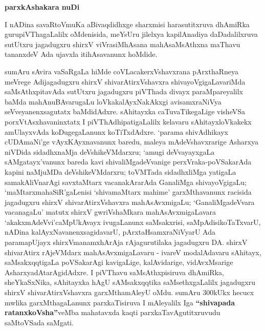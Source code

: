 \begin{center}
{\Huge\bfseries parxkAshakara nuDi}
\end{center}

I nADina savaRtoVmuKa aBivaqdidhxge sharxmisi harasutitxruva dhAmiRka gurupiVThagaLalilx oMdenisida, meYsUru jilelxya kapilA\-nadiya daDadalilxruva sutUtxru jagadugxru shirxV viVrasiMhAsana mahAsaMsAthxna maThavu tananxdeV Ada ujavxla itihAsavanunx hoMdide.

\medskip

sumAru sAvira vaSaRgaLa hiMde coVLacakerxVshavxrana pArxthaRneya meVrege Adijagadugxru shirxV shivarAtirxVshavxra shivayoVgigaLavariMda saMsAthxpitavAda sutUtxru jagadugxru piVThada divayx paraMpareyalilx baMda mahAnuBAvarugaLu loVkakalAyxNakAkxgi avisamxraNiVya seVveyanenxsagutatx baMdidAdxre. sAhitayxka caTuvaTikegaLige visheVSa porxVtAsxhavaninxtatx I piVThAdhipatigaLalilx kelavaru sAhitayxloVkakekx amUlayxvAda koDugegaLanunx koTiTxdAdxre. `parama shivAdhikayx cUDAmaNi'ge vAyxKAyxnavanunx baredu, maleya mAdeVshavxrarige Asharxya niVDida sidadhxnaMja deVshikeVMdarxru; `amugi deVvayayxgaLa sAMgatayx'vanunx bareda kavi shivaliMga\-deVvanige perxVraka-poVSakarAda kapini naMjuMDa deVshikeVMdarxru; toVMTada sidadhxliMga yatigaLa samakAliVnarAgi savxtaMtarx vacana\-kAra\-rAda GanaliMga shivayoVgigaLu; `maMtarxmahaSiR'gaLenisi `shivamaMtarx mahime' garxMthavanunx racisida jagadugxru shirxV shivarAtirxVshavxra mahAsAvxmigaLu; `GanaliMgadeVvara vacanagaLu' matutx shirxV gwriVshaMkara mahAsAvxmigaLavara `akakxmAdeVvi'\break caMpUkAvayx ivugaLanunx saMsakxrisi, saMpAdisikoTaTxvarU, nADina kalAyxNavanenxsagidavarU, pArxtaHsamxraNiVyarU Ada paramapUjayx shirxVmanamxhArAja rAjagurutilaka jagadugxru DA. shirxV shivarAtirx rAjeVMdarx mahAsAvxmigaLavaru - ivareV modalAdavaru sAhitayx, saMsakxqqti\-gaLa poVSakarAgi kavigaLige, kalAvidarige, vidAvxMsarige AsharxyadAtarAgidAdxre. I piVThavu saMsAthxpisiruva dhAmiRka, sheYkaSxNika, sAhitayxka hAgU sAMsakxqqtika saMsethxgaLalilx jagadugxru shirxV shivarAtirxVshavxra garxMtha\-mAleyU oMdu. sumAru 300kUkx hecucx mwlika garxMthagaLanunx parxkaTisiruva I mAleyalilx Iga \textbf{``shivapada ratanxkoVsha''}veMba mahatavxda kaqti parxkaTavAgutitxruvudu saMtoVSada saMgati.

\medskip

